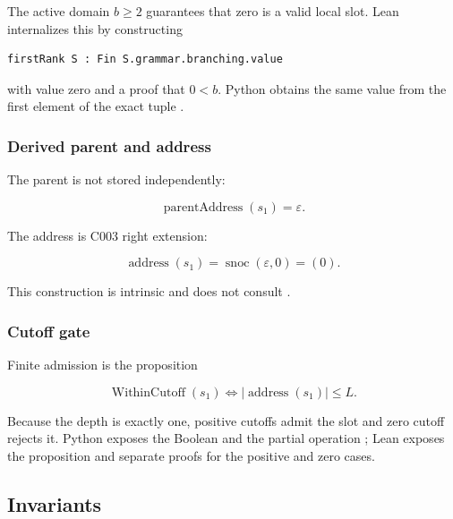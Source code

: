 The active domain \(b\ge2\) guarantees that zero is a valid local slot.
Lean internalizes this by constructing

\begin{verbatim}
firstRank S : Fin S.grammar.branching.value
\end{verbatim}

with value zero and a proof that \(0<b\). Python obtains the same value
from the first element of the exact tuple
\texttt{\protect{}}.

\subsubsection{Derived parent and
address}\label{derived-parent-and-address}

The parent is not stored independently:

\[
\operatorname{parentAddress}(s_1)=\varepsilon.
\]

The address is C003 right extension:

\[
\operatorname{address}(s_1)
 =\operatorname{snoc}(\varepsilon,0)
 =(0).
\]

This construction is intrinsic and does not consult \texttt{\protect{}}.

\subsubsection{Cutoff gate}\label{cutoff-gate}

Finite admission is the proposition

\[
\operatorname{WithinCutoff}(s_1)
\iff
|\operatorname{address}(s_1)|\le L.
\]

Because the depth is exactly one, positive cutoffs admit the slot and
zero cutoff rejects it. Python exposes the Boolean
\texttt{\protect{}} and the partial operation
\texttt{\protect{}}; Lean exposes the proposition
\texttt{\protect{}} and separate proofs for the positive and zero
cases.

\subsection{Invariants}\label{invariants-2}

